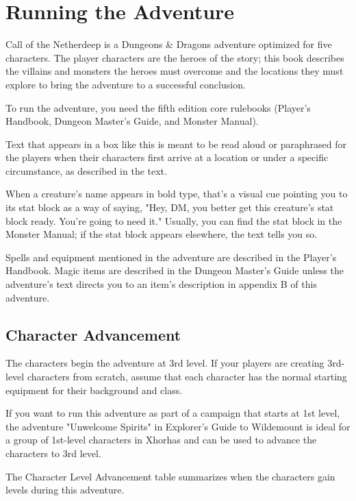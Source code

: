\documentclass[10pt,a4paper,twoside,twocolumn,openany,nodeprecatedcode]{dndbook}
\begin{document}
\section{Running the Adventure}
Call of the Netherdeep is a Dungeons \& Dragons adventure optimized for five characters. The player characters are the heroes of the story; this book describes the villains and monsters the heroes must overcome and the locations they must explore to bring the adventure to a successful conclusion.

To run the adventure, you need the fifth edition core rulebooks (Player's Handbook, Dungeon Master's Guide, and Monster Manual).

\begin{DndReadAloud}{}
Text that appears in a box like this is meant to be read aloud or paraphrased for the players when their characters first arrive at a location or under a specific circumstance, as described in the text.

\end{DndReadAloud}

When a creature's name appears in bold type, that's a visual cue pointing you to its stat block as a way of saying, "Hey, DM, you better get this creature's stat block ready. You're going to need it." Usually, you can find the stat block in the Monster Manual; if the stat block appears elsewhere, the text tells you so.

Spells and equipment mentioned in the adventure are described in the Player's Handbook. Magic items are described in the Dungeon Master's Guide unless the adventure's text directs you to an item's description in appendix B of this adventure.

\subsection{Character Advancement}
The characters begin the adventure at 3rd level. If your players are creating 3rd-level characters from scratch, assume that each character has the normal starting equipment for their background and class.

If you want to run this adventure as part of a campaign that starts at 1st level, the adventure "Unwelcome Spirits" in Explorer's Guide to Wildemount is ideal for a group of 1st-level characters in Xhorhas and can be used to advance the characters to 3rd level.

The Character Level Advancement table summarizes when the characters gain levels during this adventure.
\end{document}
